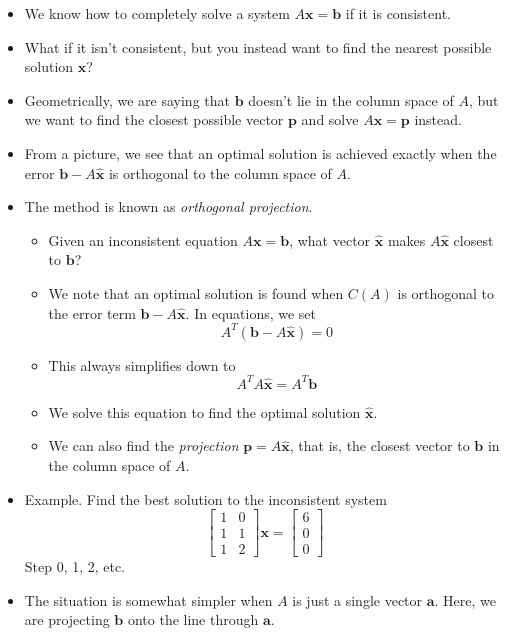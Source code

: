 \documentclass[11pt,oneside]{amsbook}
\theoremstyle{definition}
\theoremstyle{plain}
\theoremstyle{definition}
\theoremstyle{remark}
\numberwithin{equation}{section}
\numberwithin{figure}{section}
\begin{document}
\begin{itemize}
\item We know how to completely solve a system $A\mathbf{x}=\mathbf{b}$ if it is consistent.
\item What if it isn't consistent, but you instead want to find the nearest possible solution $\mathbf{x}$?
\item Geometrically, we are saying that $\mathbf{b}$ doesn't lie in the column space of $A$, but we want to find the closest possible vector $\mathbf{p}$ and solve $A\mathbf{x}=\mathbf{p}$ instead.
\item From a picture, we see that an optimal solution is achieved exactly when the error $\mathbf{b}-A\hat{\mathbf{x}}$ is orthogonal to the column space of $A$.
\item The method is known as \emph{orthogonal projection}.
  \begin{itemize}
  \item Given an inconsistent equation $A\mathbf{x}=\mathbf{b}$, what vector $\hat{\mathbf{x}}$ makes $A\hat{\mathbf{x}}$ closest to $\mathbf{b}$?
  \item We note that an optimal solution is found when $C(A)$ is orthogonal to the error term $\mathbf{b}-A\hat{\mathbf{x}}$. In equations, we set
    \[A^T(\mathbf{b}-A\hat{\mathbf{x}})=0
    \]
  \item This always simplifies down to
    \[A^TA\hat{\mathbf{x}}=A^T\mathbf{b}
    \]
  \item We solve this equation to find the optimal solution $\hat{\mathbf{x}}$.
  \item We can also find the \emph{projection} $\mathbf{p}=A\hat{\mathbf{x}}$, that is, the closest vector to $\mathbf{b}$ in the column space of $A$.
  \end{itemize}
\item Example. Find the best solution to the inconsistent system
  \[\begin{bmatrix}1&0\\1&1\\1&2\end{bmatrix}\mathbf{x}
    =\begin{bmatrix}6\\0\\0\end{bmatrix}
  \]
  Step 0, 1, 2, etc.
\item The situation is somewhat simpler when $A$ is just a single vector $\mathbf{a}$. Here, we are projecting $\mathbf{b}$ onto the line through $\mathbf{a}$.
  \begin{itemize}

\end{itemize}
\end{itemize}
\end{document}
